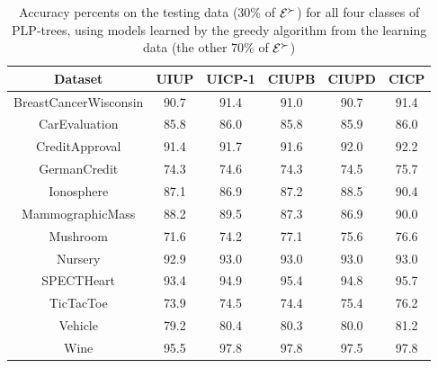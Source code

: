 \begin{table}
  \centering
  \small
  \caption{Accuracy percents on the testing data (30\% of $\mathcal{E}^\succ$)
					 for all four classes of PLP-trees, using models learned
					 by the greedy algorithm from the learning 
					 data (the other 70\% of $\mathcal{E}^\succ$)}
	\setlength\tabcolsep{6pt}
  \begin{tabular}{ |c||c|c|c|c|c| }
    \hline
    Dataset          	 & UIUP & UICP-1 & CIUPB & CIUPD & CICP \\
    \hline \hline                                             
    BreastCancerWisconsin                & 90.7 & 91.4   & 91.0  & 90.7  & 91.4   \\ \hline
    CarEvaluation                 & 85.8 & 86.0   & 85.8  & 85.9  & 86.0   \\ \hline
    CreditApproval                 & 91.4 & 91.7   & 91.6  & 92.0  & 92.2   \\ \hline
    GermanCredit                 & 74.3 & 74.6   & 74.3  & 74.5  & 75.7   \\ \hline
    Ionosphere                 & 87.1 & 86.9   & 87.2  & 88.5  & 90.4   \\ \hline
    MammographicMass                 & 88.2 & 89.5   & 87.3  & 86.9  & 90.0   \\ \hline
    Mushroom                 & 71.6 & 74.2   & 77.1  & 75.6  & 76.6   \\ \hline
    Nursery                 & 92.9 & 93.0   & 93.0  & 93.0  & 93.0   \\ \hline
    SPECTHeart                 & 93.4 & 94.9   & 95.4  & 94.8  & 95.7   \\ \hline
    TicTacToe                & 73.9 & 74.5   & 74.4  & 75.4  & 76.2   \\ \hline
    Vehicle                 & 79.2 & 80.4   & 80.3  & 80.0  & 81.2   \\ \hline
    Wine                 & 95.5 & 97.8   & 97.8  & 97.5  & 97.8   \\ \hline
  \end{tabular}
  \label{tbl:trees2}
\end{table}


